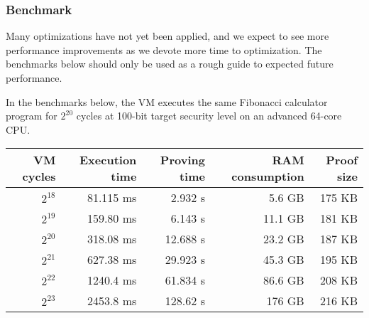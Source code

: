 \subsubsection{Benchmark}\label{section: starky-benchmark}

Many optimizations have not yet been applied, and we expect to see more performance improvements as we devote more time to optimization. The benchmarks below should only be used as a rough guide to expected future performance.

In the benchmarks below, the VM executes the same Fibonacci calculator program for $2^{20}$ cycles at 100-bit target security level on an advanced 64-core CPU.

\begin{table}[!ht]
    \centering
    \begin{tabular}{|r|r|r|r|r|}
        \hline
        VM cycles & Execution time & Proving time & RAM consumption & Proof size \\
        \hline
        $2^{18}$ & 81.115 ms & 2.932 s & 5.6 GB & 175 KB \\
        \hline
        $2^{19}$ & 159.80 ms & 6.143 s & 11.1 GB & 181 KB \\
        \hline
        $2^{20}$ & 318.08 ms &12.688 s & 23.2 GB & 187 KB \\
        \hline
        $2^{21}$ & 627.38 ms & 29.923 s & 45.3 GB & 195 KB \\
        \hline
        $2^{22}$ & 1240.4 ms & 61.834 s & 86.6 GB & 208 KB \\
        \hline
        $2^{23}$ & 2453.8 ms & 128.62 s & 176 GB & 216 KB \\
        \hline
    \end{tabular}
\end{table}
